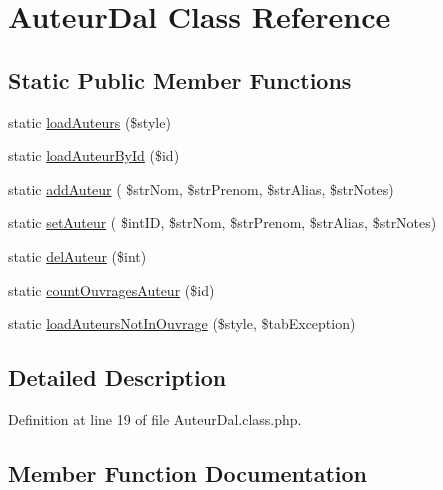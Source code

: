 \hypertarget{class_auteur_dal}{}\section{Auteur\+Dal Class Reference}
\label{class_auteur_dal}
\subsection*{Static Public Member Functions}
\begin{DoxyCompactItemize}
\item 
static \hyperlink{class_auteur_dal_a1096258c13846a2b007a333c8a571e61}{load\+Auteurs} (\$style)
\item 
static \hyperlink{class_auteur_dal_a666c9a00825829e8b8ad711b0fce62fc}{load\+Auteur\+By\+Id} (\$id)
\item 
static \hyperlink{class_auteur_dal_a06e7bcc6702a46558cd2944425704b09}{add\+Auteur} ( \$str\+Nom, \$str\+Prenom, \$str\+Alias, \$str\+Notes)
\item 
static \hyperlink{class_auteur_dal_af7a17c6e64f9678c105a411b4502b04c}{set\+Auteur} ( \$int\+ID, \$str\+Nom, \$str\+Prenom, \$str\+Alias, \$str\+Notes)
\item 
static \hyperlink{class_auteur_dal_a6d3d3c3b786607d460707f5ceaf74adb}{del\+Auteur} (\$int)
\item 
static \hyperlink{class_auteur_dal_a9ad0fe752db876e5b0813b628f800a2a}{count\+Ouvrages\+Auteur} (\$id)
\item 
static \hyperlink{class_auteur_dal_a643d77276a6ac49ba29001ecf1b50439}{load\+Auteurs\+Not\+In\+Ouvrage} (\$style, \$tab\+Exception)
\end{DoxyCompactItemize}


\subsection{Detailed Description}


Definition at line 19 of file Auteur\+Dal.\+class.\+php.



\subsection{Member Function Documentation}
\mbox{\label{class_auteur_dal_a06e7bcc6702a46558cd2944425704b09}} 
